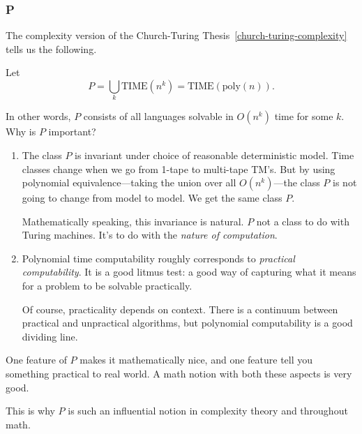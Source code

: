 \subsubsection{P}

The complexity version of the Church-Turing Thesis~\ref{church-turing-complexity} tells us the following.\\

\vskip0.15in
\begin{df}
Let 
\[
P=\bigcup_k \text{TIME}(n^k)=\text{TIME}(\text{poly}(n)).
\]
\end{df}
In other words, $P$ consists of all languages solvable in $O(n^k)$ time for some $k$.
Why is $P$ important? 
\begin{enumerate}
\item
The class $P$ is invariant under choice of reasonable deterministic model. Time classes change when we go from 1-tape to multi-tape TM's. But by using polynomial equivalence---taking the union over all $O(n^k)$---the class $P$ is not going to change from model to model. We get the same class $P$.

Mathematically speaking, this invariance is natural. $P$ not a class to do with Turing machines. It's to do with the \emph{nature of computation}.
\item
Polynomial time computability roughly corresponds to \emph{practical computability}.  %
It is a good litmus test: a good way of capturing what it means for a problem to be solvable practically.

Of course, practicality depends on context. There is a continuum between practical and unpractical algorithms, but polynomial computability is a good dividing line. 
\end{enumerate}
One feature of $P$ makes it mathematically nice, and one feature tell you something practical to real world. A math notion with both these aspects is very good.

This is why $P$ is such an influential notion in complexity theory and throughout math.


